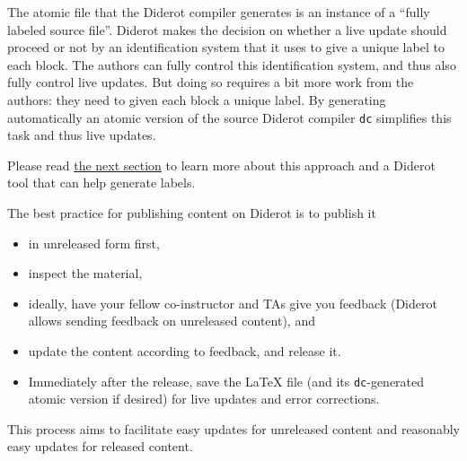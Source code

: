 \begin{gram}
%
The atomic file that the Diderot compiler generates is an instance of a ``fully labeled source file''.
%
Diderot makes the decision on whether a live update should proceed or not by an identification system that it uses to give a unique label to each block.
%
The authors can fully control this identification system, and thus also fully control live updates.
%
But doing so requires a bit more work from the authors: they need to given each block a unique label.
%
By generating automatically an atomic version of the source Diderot compiler \lstinline`dc` simplifies this task and thus live updates.
%

Please read 
%
\href{sec:publish::full-labeling}{the next section}
%
to learn more about this approach and a Diderot tool that can help generate labels.
\end{gram}


\begin{gram}
The best practice for publishing content on Diderot is to publish it 
\begin{itemize}
\item in unreleased form first, 
\item inspect the material,
\item ideally, have your fellow co-instructor and TAs give you feedback (Diderot allows sending feedback on unreleased content), and 
\item update the content according to feedback, and release it.
\item Immediately after the release, save the LaTeX file (and its \lstinline`dc`-generated atomic version if desired) for live updates and error corrections.
\end{itemize}

This process aims to facilitate easy updates for unreleased content and reasonably easy updates for released content. 
\end{gram}


